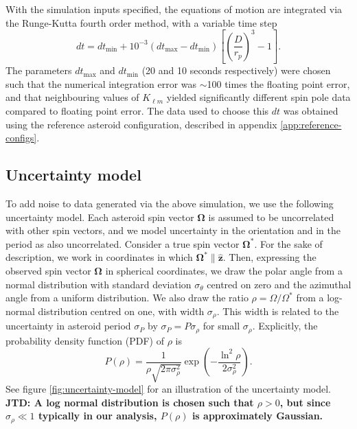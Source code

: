 \documentclass[fleqn,usenatbib]{mnras}
\newcommand{\jtd}[1]{ {\bf{\color{red} JTD: #1}} }
\newcommand{\unit}[1]{\bm{\hat{#1}}}
\newcommand{\parens}[1]{\left( #1 \right)}
\newcommand{\brackets}[1]{\left[ #1 \right]}
\begin{document}
With the simulation inputs specified, the equations of motion are integrated via the Runge-Kutta fourth order method, with a variable time step
\begin{equation}
  dt = dt_\text{min} + 10^{-3}(dt_\text{max} - dt_\text{min}) \brackets{\parens{\frac{D}{r_p}}^3 - 1}.
\end{equation}
The parameters $dt_\text{max}$ and $dt_\text{min}$ (20 and 10 seconds respectively) were chosen such that the numerical integration error was $\sim$100 times the floating point error, and that neighbouring values of $K_{\ell m}$ yielded significantly different spin pole data compared to floating point error. The data used to choose this $dt$ was obtained using the reference asteroid configuration, described in appendix \ref{app:reference-configs}.



\subsection{Uncertainty model}
\label{sec:uncertainty}

To add noise to data generated via the above simulation, we use the following uncertainty model. Each asteroid spin vector $\bm \Omega$ is assumed to be uncorrelated with other spin vectors, and we model uncertainty in the orientation and in the period as also uncorrelated. Consider a true spin vector $\bm \Omega^*$. For the sake of description, we work in coordinates in which $\bm \Omega^* \parallel \unit z$. Then, expressing the observed spin vector $\bm \Omega$ in spherical coordinates, we draw the polar angle from a normal distribution with standard deviation $\sigma_\theta$ centred on zero and the azimuthal angle from a uniform distribution. We also draw the ratio $\rho=\Omega/\Omega^*$ from a log-normal distribution centred on one, with width $\sigma_\rho$. This width is related to the uncertainty in asteroid period $\sigma_P$ by $\sigma_P=P \sigma_\rho$ for small $\sigma_\rho$. Explicitly, the probability density function (PDF) of $\rho$ is 
\begin{equation}
  P(\rho) = \frac{1}{\rho\sqrt{2\pi \sigma_\rho^2}} \exp\parens{-\frac{\ln^2\rho}{2\sigma_\rho^2}}.
\end{equation}
See figure \ref{fig:uncertainty-model} for an illustration of the uncertainty model. \jtd{A log normal distribution is chosen such that $\rho > 0$, but since $\sigma_\rho \ll 1$ typically in our analysis, $P(\rho)$ is approximately Gaussian.}
\end{document}
